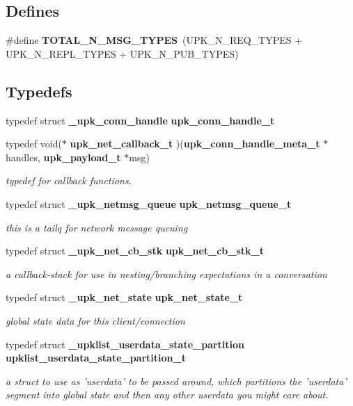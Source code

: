 \subsection*{Defines}
\begin{DoxyCompactItemize}
\item 
\#define {\bf TOTAL\_\-N\_\-MSG\_\-TYPES}~(UPK\_\-N\_\-REQ\_\-TYPES + UPK\_\-N\_\-REPL\_\-TYPES + UPK\_\-N\_\-PUB\_\-TYPES)
\end{DoxyCompactItemize}
\subsection*{Typedefs}
\begin{DoxyCompactItemize}
\item 
typedef struct {\bf \_\-upk\_\-conn\_\-handle} {\bf upk\_\-conn\_\-handle\_\-t}
\item 
typedef void($\ast$ {\bf upk\_\-net\_\-callback\_\-t} )({\bf upk\_\-conn\_\-handle\_\-meta\_\-t} $\ast$handles, {\bf upk\_\-payload\_\-t} $\ast$msg)
\begin{DoxyCompactList}\small\item\em typedef for callback functions. \end{DoxyCompactList}\item 
typedef struct {\bf \_\-upk\_\-netmsg\_\-queue} {\bf upk\_\-netmsg\_\-queue\_\-t}
\begin{DoxyCompactList}\small\item\em this is a tailq for network message queuing \end{DoxyCompactList}\item 
typedef struct {\bf \_\-upk\_\-net\_\-cb\_\-stk} {\bf upk\_\-net\_\-cb\_\-stk\_\-t}
\begin{DoxyCompactList}\small\item\em a callback-\/stack for use in nesting/branching expectations in a conversation \end{DoxyCompactList}\item 
typedef struct {\bf \_\-upk\_\-net\_\-state} {\bf upk\_\-net\_\-state\_\-t}
\begin{DoxyCompactList}\small\item\em global state data for this client/connection \end{DoxyCompactList}\item 
typedef struct {\bf \_\-upklist\_\-userdata\_\-state\_\-partition} {\bf upklist\_\-userdata\_\-state\_\-partition\_\-t}
\begin{DoxyCompactList}\small\item\em a struct to use as 'userdata' to be passed around, which partitions the 'userdata' segment into global state and then any other userdata you might care about. \end{DoxyCompactList}\end{DoxyCompactItemize}
